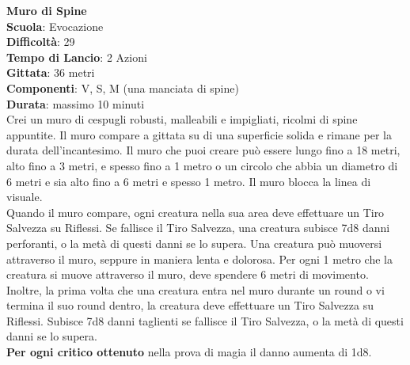 \begin{multicols}{2}
\medskip\textbf{Muro di Spine}\\
\textbf{Scuola}: Evocazione\\
\textbf{Difficoltà}: 29\\
\textbf{Tempo di Lancio}: 2 Azioni\\
\textbf{Gittata}: 36 metri\\
\textbf{Componenti}: V, S, M (una manciata di spine)\\
\textbf{Durata}: massimo 10 minuti\\
Crei un muro di cespugli robusti, malleabili e impigliati, ricolmi di spine appuntite. Il muro compare a gittata su di una superficie solida e rimane per la durata dell'incantesimo. Il muro che puoi creare può essere lungo fino a 18 metri, alto fino a 3 metri, e spesso fino a 1 metro o un circolo che abbia un diametro di 6 metri e sia alto fino a 6 metri e spesso 1 metro. Il muro blocca la linea di visuale.\\
Quando il muro compare, ogni creatura nella sua area deve effettuare un Tiro Salvezza su Riflessi. Se fallisce il Tiro Salvezza, una creatura subisce 7d8 danni perforanti, o la metà di questi danni se lo supera. Una creatura può muoversi attraverso il muro, seppure in maniera lenta e dolorosa. Per ogni 1 metro che la creatura si muove attraverso il muro, deve spendere 6 metri di movimento. Inoltre, la prima volta che una creatura entra nel muro durante un round o vi termina il suo round dentro, la creatura deve effettuare un Tiro Salvezza su Riflessi. Subisce 7d8 danni taglienti se fallisce il Tiro Salvezza, o la metà di questi danni se lo supera.\\
\textbf{Per ogni critico ottenuto} nella prova di magia il danno aumenta di 1d8.


\end{multicols}

